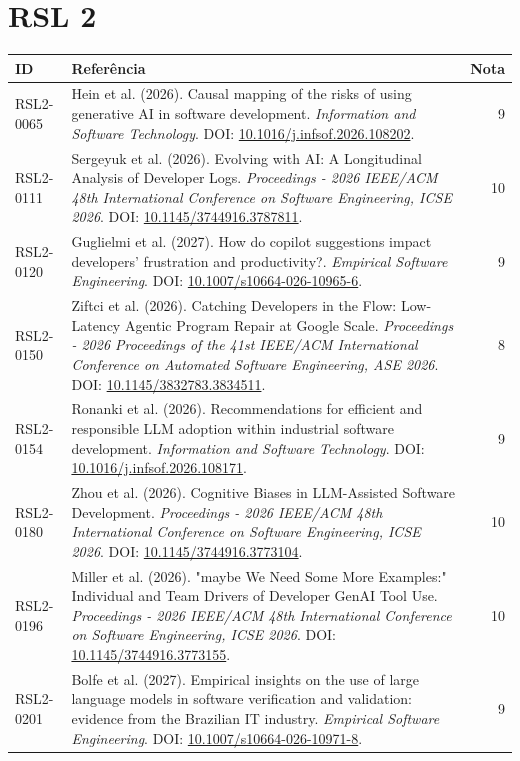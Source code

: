 \section{RSL 2}
\begin{small}
\begin{longtable}{lp{11.2cm}r}
\hline
\textbf{ID} & \textbf{Referência} & \textbf{Nota} \\ \hline\endhead
RSL2-0065 & Hein et al. (2026). Causal mapping of the risks of using generative AI in software development. \textit{Information and Software Technology}. DOI: \url{10.1016/j.infsof.2026.108202}. & 9 \\
RSL2-0111 & Sergeyuk et al. (2026). Evolving with AI: A Longitudinal Analysis of Developer Logs. \textit{Proceedings - 2026 IEEE/ACM 48th International Conference on Software Engineering, ICSE 2026}. DOI: \url{10.1145/3744916.3787811}. & 10 \\
RSL2-0120 & Guglielmi et al. (2027). How do copilot suggestions impact developers’ frustration and productivity?. \textit{Empirical Software Engineering}. DOI: \url{10.1007/s10664-026-10965-6}. & 9 \\
RSL2-0150 & Ziftci et al. (2026). Catching Developers in the Flow: Low-Latency Agentic Program Repair at Google Scale. \textit{Proceedings - 2026 Proceedings of the 41st IEEE/ACM International Conference on Automated Software Engineering, ASE 2026}. DOI: \url{10.1145/3832783.3834511}. & 8 \\
RSL2-0154 & Ronanki et al. (2026). Recommendations for efficient and responsible LLM adoption within industrial software development. \textit{Information and Software Technology}. DOI: \url{10.1016/j.infsof.2026.108171}. & 9 \\
RSL2-0180 & Zhou et al. (2026). Cognitive Biases in LLM-Assisted Software Development. \textit{Proceedings - 2026 IEEE/ACM 48th International Conference on Software Engineering, ICSE 2026}. DOI: \url{10.1145/3744916.3773104}. & 10 \\
RSL2-0196 & Miller et al. (2026). "maybe We Need Some More Examples:" Individual and Team Drivers of Developer GenAI Tool Use. \textit{Proceedings - 2026 IEEE/ACM 48th International Conference on Software Engineering, ICSE 2026}. DOI: \url{10.1145/3744916.3773155}. & 10 \\
RSL2-0201 & Bolfe et al. (2027). Empirical insights on the use of large language models in software verification and validation: evidence from the Brazilian IT industry. \textit{Empirical Software Engineering}. DOI: \url{10.1007/s10664-026-10971-8}. & 9 \\

\end{longtable}
\end{small}
